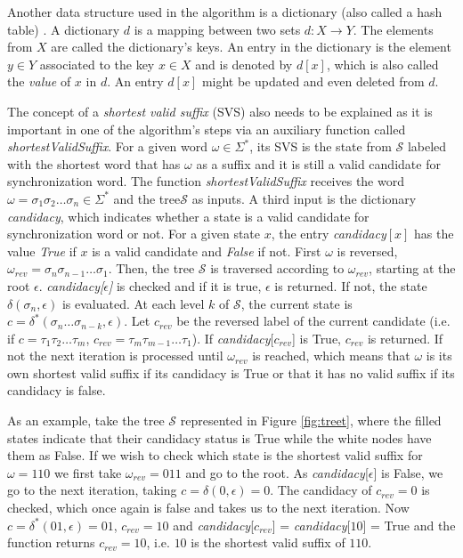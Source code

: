 { Another data structure used in the algorithm is a dictionary (also called a hash table) \citep{thomas2001introduction}. A dictionary $d$ is a mapping between two sets $d: X \rightarrow Y$. The elements from $X$ are called the dictionary's keys. An entry in the dictionary is the element $y \in Y$ associated to the key $x \in X$ and is denoted by $d[x]$, which is also called the \textit{value} of $x$ in $d$. An entry $d[x]$ might be updated and even deleted from $d$.
 
The concept of a \textit{shortest valid suffix} (SVS) also needs to be explained as it is important in one of the algorithm's steps via an auxiliary function called \textit{shortestValidSuffix}. For a given word $\omega \in \Sigma^*$, its SVS is the state from $\mathcal{S}$ labeled with the shortest word that has $\omega$ as a suffix and it is still a valid candidate for synchronization word. The function \textit{shortestValidSuffix} receives the word $\omega = \sigma_1\sigma_2\ldots\sigma_n \in \Sigma^*$ and the tree$\mathcal{S}$ as inputs. A third input is the dictionary \textit{candidacy}, which indicates whether a state is a valid candidate for synchronization word or not. For a given state $x$, the entry \textit{candidacy}$[x]$ has the value \textit{True} if $x$ is a valid candidate and \textit{False} if not. First $\omega$ is reversed, $\omega_{rev} = \sigma_n\sigma_{n-1}\ldots\sigma_1$. Then, the tree $\mathcal{S}$ is traversed according to $\omega_{rev}$, starting at the root $\epsilon$. \textit{candidacy[$\epsilon$]} is checked and if it is true, $\epsilon$ is returned. If not, the state $\delta(\sigma_n, \epsilon)$ is evaluated. At each level $k$ of $\mathcal{S}$, the current state is $c = \delta^*(\sigma_n\ldots\sigma_{n-k},\epsilon)$. Let $c_{rev}$ be the reversed label of the current candidate (i.e. if $c = \tau_1\tau_2\ldots\tau_m$, $c_{rev} = \tau_m\tau_{m-1}\ldots\tau_1$). If \textit{candidacy}[$c_{rev}$] is True, $c_{rev}$ is returned. If not the next iteration is processed until $\omega_{rev}$ is reached, which means that $\omega$ is its own shortest valid suffix if its candidacy is True or that it has no valid suffix if its candidacy is false.
 
 As an example, take the tree $\mathcal{S}$ represented in Figure \ref{fig:treet}, where the filled states indicate that their candidacy status is True while the white nodes have them as False. If we wish to check which state is the shortest valid suffix for $\omega = 110$ we first take $\omega_{rev} = 011$ and go to the root. As \textit{candidacy}[$\epsilon$] is False, we go to the next iteration, taking $c = \delta(0, \epsilon) = 0$. The candidacy of $c_{rev} = 0$ is checked, which once again is false and takes us to the next iteration. Now $c = \delta^*(01, \epsilon) = 01$, $c_{rev} = 10$ and \textit{candidacy}[$c_{rev}$] = \textit{candidacy}[$10$] = True and the function returns $c_{rev} = 10$, i.e. $10$ is the shortest valid suffix of $110$.

}

